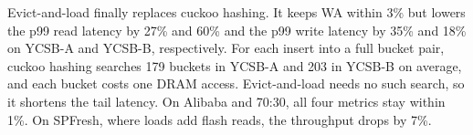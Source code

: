 Evict-and-load finally replaces cuckoo hashing. It keeps WA within 3\% but lowers the p99
read latency by 27\% and 60\% and the p99 write latency by 35\% and 18\% on YCSB-A
and YCSB-B, respectively. For each insert into a full bucket pair, cuckoo hashing searches 179
buckets in YCSB-A and 203 in YCSB-B on average, and each bucket costs one DRAM access.
Evict-and-load needs no such search, so it shortens the tail latency. On Alibaba and 70:30, all four metrics stay within
1\%. On SPFresh, where loads add flash reads, the throughput drops by 7\%.

